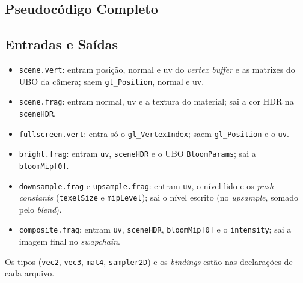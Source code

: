 \subsection{Pseudocódigo Completo}









\subsection{Entradas e Saídas}
\begin{itemize}
    \setlength{\itemsep}{0pt}
    \item \texttt{scene.vert}: entram posição, normal e uv do \textit{vertex buffer} e as matrizes do UBO da câmera; saem \texttt{gl\_Position}, normal e uv.
    \item \texttt{scene.frag}: entram normal, uv e a textura do material; sai a cor HDR na \texttt{sceneHDR}.
    \item \texttt{fullscreen.vert}: entra só o \texttt{gl\_VertexIndex}; saem \texttt{gl\_Position} e o \texttt{uv}.
    \item \texttt{bright.frag}: entram \texttt{uv}, \texttt{sceneHDR} e o UBO \texttt{BloomParams}; sai a \texttt{bloomMip[0]}.
    \item \texttt{downsample.frag} e \texttt{upsample.frag}: entram \texttt{uv}, o nível lido e os \textit{push constants} (\texttt{texelSize} e \texttt{mipLevel}); sai o nível escrito (no \textit{upsample}, somado pelo \textit{blend}).
    \item \texttt{composite.frag}: entram \texttt{uv}, \texttt{sceneHDR}, \texttt{bloomMip[0]} e o \texttt{intensity}; sai a imagem final no \textit{swapchain}.
\end{itemize}
Os tipos (\texttt{vec2}, \texttt{vec3}, \texttt{mat4}, \texttt{sampler2D}) e os \textit{bindings} estão nas declarações de cada arquivo.

